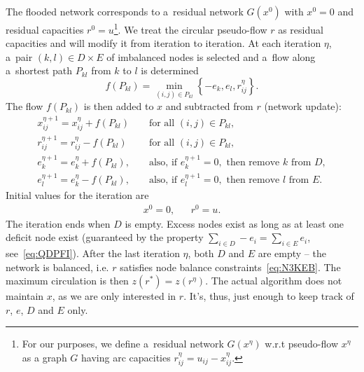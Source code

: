 \documentclass[paper=a4,parskip=half,DIV=12]{leetcode}
\begin{document}
The flooded network corresponds to a~residual network $G(x^0)$ with $x^0 = 0$
and residual capacities $r^0 = u$\footnote{For our purposes, we define
a~residual network $G(x^{\eta})$ w.r.t pseudo-flow $x^{\eta}$ as a graph $G$
having arc capacities $r^{\eta}_{ij} = u_{ij} - x^{\eta}_{ij}$.}. We treat the
circular pseudo-flow $r$ as residual capacities and will modify it from
iteration to iteration. At each iteration $\eta$, a~pair $(k,l) \in D \times E$
of imbalanced nodes is selected and a~flow along a~shortest path $P_{kl}$ from
$k$ to $l$ is determined
\begin{equation}
  f(P_{kl}) = \min_{(i,j) \in P_{kl}}{\left\lbrace -e_k, e_l, r^{\eta}_{ij} \right\rbrace}.
  \label{eq:WCR8C}
\end{equation}
The flow $f(P_{kl})$ is then added to $x$ and subtracted from $r$ (network
update):
\begin{equation}
  \begin{aligned}
    & x^{\eta+1}_{ij} = x^{\eta}_{ij} + f(P_{kl}) && \text{ for all } (i,j) \in P_{kl}, &
    \\
    & r^{\eta+1}_{ij} = r^{\eta}_{ij} - f(P_{kl}) && \text{ for all } (i,j) \in P_{kl}, &
    \\
    & e^{\eta+1}_k = e^{\eta}_k + f(P_{kl}), &
    & \text{ also, if } e^{\eta+1}_k = 0, \text{ then remove }k \text{ from } D, &
    \\
    & e^{\eta+1}_l = e^{\eta}_k - f(P_{kl}), &
    & \text{ also, if } e^{\eta+1}_l = 0, \text{ then remove }l \text{ from } E. &
  \end{aligned}
  \label{eq:WTLZT}
\end{equation}
Initial values for the iteration are
\begin{equation}
  \begin{aligned}
    & x^0 = 0, && r^0 = u. &
  \end{aligned}
\end{equation}
The iteration ends when $D$ is empty. Excess nodes exist as long as at least
one deficit node exist (guaranteed by the property $\sum_{i \in D} -e_i =
\sum_{i \in E} e_i$, see~\eqref{eq:QDPFI}). After the last iteration $\eta$,
both $D$ and $E$ are empty -- the network is balanced, i.e. $r$ satisfies node
balance constraints~\eqref{eq:N3KEB}. The maximum circulation is then $z(r^{*})
= z(r^{\eta})$. The actual algorithm does not maintain $x$, as we are only
interested in $r$. It's, thus, just enough to keep track of $r$, $e$, $D$ and
$E$ only.
\end{document}

